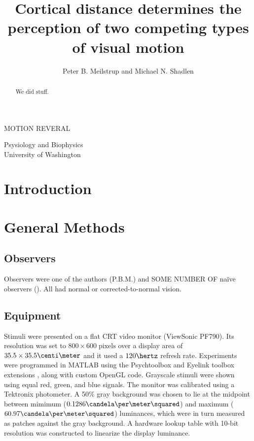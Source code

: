 \documentclass[english,jou]{article}
\makeatletter
\def\maxwidth{%
\ifdim\Gin@nat@width>\linewidth
\linewidth
\else
\Gin@nat@width
\fi
}
\makeatother
\begin{document}
\title{Cortical distance determines the perception of two competing types
of visual motion}

\maketitle
MOTION REVERAL


\author{Peter B. Meilstrup and Michael N. Shadlen}

Psysiology and Biophysics\\
University of Washington





\setkeys{Gin}{width=\maxwidth}


\begin{abstract}
We did stuff.
\end{abstract}

\section{Introduction}




\section{General Methods}


\subsection{Observers}

Observers were one of the authors (P.B.M.) and SOME NUMBER OF na\"{i}ve
observers (). All had normal or corrected-to-normal vision.


\subsection{Equipment}







Stimuli were presented on a flat CRT video monitor (ViewSonic PF790).
Its resolution was set to $800\times600\;\mathrm{pixels}$
over a display area of $35.5\times35.5\centi\meter$
and it used a $120\hertz$ refresh rate. Experiments
were programmed in MATLAB using the Psychtoolbox \citep{Brainard:1997gq}
and Eyelink toolbox extensions \citep{Cornelissen:2002wl}, along
with custom OpenGL code. Grayscale stimuli were shown using equal
red, green, and blue signals. The monitor was calibrated using a Tektronix
photometer. A 50\% gray background was chosen to lie at the midpoint
between mimimum ($0.1286 \candela\per\meter\squared$)
and maximum ($60.97 \candela\per\meter\squared$)
luminances, which were in turn measured as patches against the gray
background. A hardware lookup table with 10-bit resolution was constructed
to linearize the display luminance. 
\end{document}
